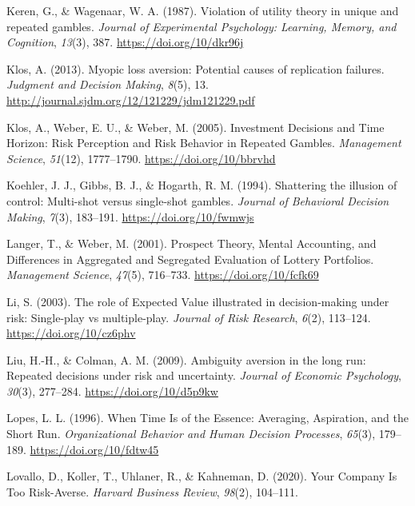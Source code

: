 \documentclass[
  english,
  man, donotrepeattitle,floatsintext]{apa7}
\newlength{\cslhangindent}
\newenvironment{cslreferences}%
  {\setlength{\parindent}{0pt}%
  \everypar{\setlength{\hangindent}{\cslhangindent}}\ignorespaces}%
  {\par}
\theoremstyle{definition}
\theoremstyle{definition}
\theoremstyle{definition}
\theoremstyle{definition}
\theoremstyle{remark}
\begin{document}
\begin{cslreferences}
\leavevmode\hypertarget{ref-keren1987}{}%
Keren, G., \& Wagenaar, W. A. (1987). Violation of utility theory in unique and repeated gambles. \emph{Journal of Experimental Psychology: Learning, Memory, and Cognition}, \emph{13}(3), 387. \url{https://doi.org/10/dkr96j}

\leavevmode\hypertarget{ref-klos2013}{}%
Klos, A. (2013). Myopic loss aversion: Potential causes of replication failures. \emph{Judgment and Decision Making}, \emph{8}(5), 13. \url{http://journal.sjdm.org/12/121229/jdm121229.pdf}

\leavevmode\hypertarget{ref-klos2005}{}%
Klos, A., Weber, E. U., \& Weber, M. (2005). Investment Decisions and Time Horizon: Risk Perception and Risk Behavior in Repeated Gambles. \emph{Management Science}, \emph{51}(12), 1777--1790. \url{https://doi.org/10/bbrvhd}

\leavevmode\hypertarget{ref-koehler1994}{}%
Koehler, J. J., Gibbs, B. J., \& Hogarth, R. M. (1994). Shattering the illusion of control: Multi-shot versus single-shot gambles. \emph{Journal of Behavioral Decision Making}, \emph{7}(3), 183--191. \url{https://doi.org/10/fwmwjs}

\leavevmode\hypertarget{ref-langer2001}{}%
Langer, T., \& Weber, M. (2001). Prospect Theory, Mental Accounting, and Differences in Aggregated and Segregated Evaluation of Lottery Portfolios. \emph{Management Science}, \emph{47}(5), 716--733. \url{https://doi.org/10/fcfk69}

\leavevmode\hypertarget{ref-li2003}{}%
Li, S. (2003). The role of Expected Value illustrated in decision-making under risk: Single-play vs multiple-play. \emph{Journal of Risk Research}, \emph{6}(2), 113--124. \url{https://doi.org/10/cz6phv}

\leavevmode\hypertarget{ref-liu2009}{}%
Liu, H.-H., \& Colman, A. M. (2009). Ambiguity aversion in the long run: Repeated decisions under risk and uncertainty. \emph{Journal of Economic Psychology}, \emph{30}(3), 277--284. \url{https://doi.org/10/d5p9kw}

\leavevmode\hypertarget{ref-lopes1996}{}%
Lopes, L. L. (1996). When Time Is of the Essence: Averaging, Aspiration, and the Short Run. \emph{Organizational Behavior and Human Decision Processes}, \emph{65}(3), 179--189. \url{https://doi.org/10/fdtw45}

\leavevmode\hypertarget{ref-lovallo2020}{}%
Lovallo, D., Koller, T., Uhlaner, R., \& Kahneman, D. (2020). Your Company Is Too Risk-Averse. \emph{Harvard Business Review}, \emph{98}(2), 104--111.


\end{cslreferences}
\end{document}
